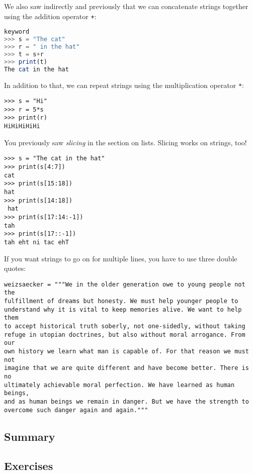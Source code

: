 \documentclass[11pt]{cselabheader}
\begin{document}
We also saw indirectly and previously that we can concatenate strings together
using the addition operator \lstinline!+!:
\begin{lstlisting}[style=ipython,language=Octave] % octave doesn't have in
keyword
>>> s = "The cat"
>>> r = " in the hat"
>>> t = s+r
>>> print(t)
The cat in the hat
\end{lstlisting}

In addition to that, we can repeat strings using the multiplication operator
\lstinline!*!: 
\begin{lstlisting}[style=ipython]
>>> s = "Hi"
>>> r = 5*s
>>> print(r)
HiHiHiHiHi
\end{lstlisting}


You previously saw \emph{slicing} in the section on lists. Slicing works on strings, too!
\begin{lstlisting}[style=ipython]
>>> s = "The cat in the hat"
>>> print(s[4:7])
cat
>>> print(s[15:18])
hat
>>> print(s[14:18])
 hat
>>> print(s[17:14:-1])
tah
>>> print(s[17::-1])
tah eht ni tac ehT
\end{lstlisting}

If you want strings to go on for multiple lines, you have to use three double
quotes:
\begin{lstlisting}
weizsaecker = """We in the older generation owe to young people not the 
fulfillment of dreams but honesty. We must help younger people to 
understand why it is vital to keep memories alive. We want to help them 
to accept historical truth soberly, not one-sidedly, without taking 
refuge in utopian doctrines, but also without moral arrogance. From our
own history we learn what man is capable of. For that reason we must not
imagine that we are quite different and have become better. There is no
ultimately achievable moral perfection. We have learned as human beings,
and as human beings we remain in danger. But we have the strength to 
overcome such danger again and again."""
\end{lstlisting} 

\subsection{Summary}

\subsection{Exercises}
\label{subsec:stringsex}
\end{document}
